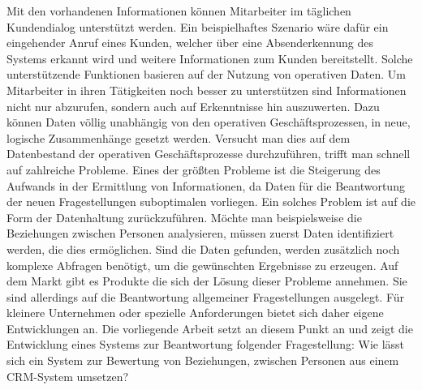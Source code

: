 Mit den vorhandenen Informationen können Mitarbeiter im täglichen Kundendialog unterstützt werden. Ein beispielhaftes Szenario wäre dafür ein eingehender Anruf eines Kunden, welcher über eine Absenderkennung des Systems erkannt wird und weitere Informationen zum Kunden bereitstellt. Solche unterstützende Funktionen basieren auf der Nutzung von operativen Daten. Um Mitarbeiter in ihren Tätigkeiten noch besser zu unterstützen sind Informationen nicht nur abzurufen, sondern auch auf Erkenntnisse hin auszuwerten. Dazu können Daten völlig unabhängig von den operativen Geschäftsprozessen, in neue, logische Zusammenhänge gesetzt werden. Versucht man dies auf dem Datenbestand der operativen Geschäftsprozesse durchzuführen, trifft man schnell auf zahlreiche Probleme. Eines der größten Probleme ist die Steigerung des Aufwands in der Ermittlung von Informationen, da Daten für die Beantwortung der neuen Fragestellungen suboptimalen vorliegen. Ein solches Problem ist auf die Form der Datenhaltung zurückzuführen. Möchte man beispielsweise die Beziehungen zwischen Personen analysieren, müssen zuerst Daten identifiziert werden, die dies ermöglichen. Sind die Daten gefunden, werden zusätzlich noch komplexe Abfragen benötigt, um die gewünschten Ergebnisse zu erzeugen. Auf dem Markt gibt es Produkte die sich der Lösung dieser Probleme annehmen. Sie sind allerdings auf die Beantwortung allgemeiner Fragestellungen ausgelegt. Für kleinere Unternehmen oder spezielle Anforderungen bietet sich daher eigene Entwicklungen an. Die vorliegende Arbeit setzt an diesem Punkt an und zeigt die Entwicklung eines Systems zur Beantwortung folgender Fragestellung: Wie lässt sich ein System zur Bewertung von Beziehungen, zwischen Personen aus einem CRM-System umsetzen?






